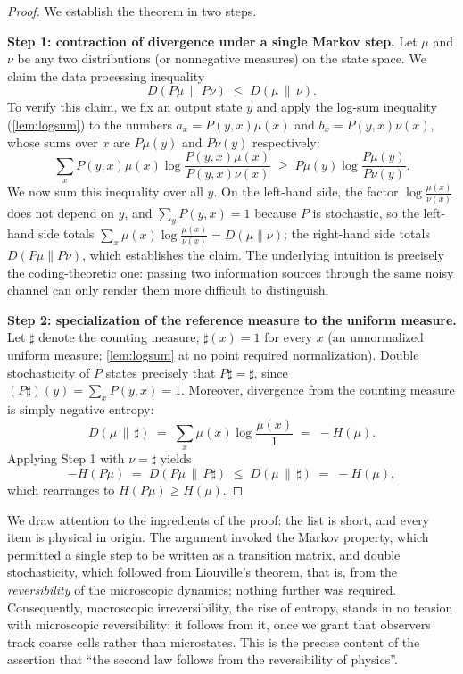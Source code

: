 \documentclass[11pt]{article}
\begin{document}
\begin{proof}
We establish the theorem in two steps.

\textbf{Step 1: contraction of divergence under a single Markov step.} Let $\mu$ and $\nu$ be any two distributions (or nonnegative measures) on the state space. We claim the data processing inequality
\[
D(P\mu \,\|\, P\nu) \;\le\; D(\mu \,\|\, \nu).
\]
To verify this claim, we fix an output state $y$ and apply the log-sum inequality (\cref{lem:logsum}) to the numbers $a_x = P(y,x)\mu(x)$ and $b_x = P(y,x)\nu(x)$, whose sums over $x$ are $P\mu(y)$ and $P\nu(y)$ respectively:
\[
\sum_x P(y,x)\mu(x) \log \frac{P(y,x)\mu(x)}{P(y,x)\nu(x)} \;\ge\; P\mu(y) \log \frac{P\mu(y)}{P\nu(y)}.
\]
We now sum this inequality over all $y$. On the left-hand side, the factor $\log\frac{\mu(x)}{\nu(x)}$ does not depend on $y$, and $\sum_y P(y,x) = 1$ because $P$ is stochastic, so the left-hand side totals $\sum_x \mu(x)\log\frac{\mu(x)}{\nu(x)} = D(\mu\|\nu)$; the right-hand side totals $D(P\mu \| P\nu)$, which establishes the claim. The underlying intuition is precisely the coding-theoretic one: passing two information sources through the same noisy channel can only render them more difficult to distinguish.

\textbf{Step 2: specialization of the reference measure to the uniform measure.} Let $\sharp$ denote the counting measure, $\sharp(x) = 1$ for every $x$ (an unnormalized uniform measure; \cref{lem:logsum} at no point required normalization). Double stochasticity of $P$ states precisely that $P\sharp = \sharp$, since $(P\sharp)(y) = \sum_x P(y,x) = 1$. Moreover, divergence from the counting measure is simply negative entropy:
\[
D(\mu \,\|\, \sharp) \;=\; \sum_x \mu(x) \log \frac{\mu(x)}{1} \;=\; -H(\mu).
\]
Applying Step 1 with $\nu = \sharp$ yields
\[
-H(P\mu) \;=\; D(P\mu \,\|\, P \sharp) \;\le\; D(\mu \,\|\, \sharp) \;=\; -H(\mu),
\]
which rearranges to $H(P\mu) \ge H(\mu)$.
\end{proof}

We draw attention to the ingredients of the proof: the list is short, and every item is physical in origin. The argument invoked the Markov property, which permitted a single step to be written as a transition matrix, and double stochasticity, which followed from Liouville's theorem, that is, from the \emph{reversibility} of the microscopic dynamics; nothing further was required. Consequently, macroscopic irreversibility, the rise of entropy, stands in no tension with microscopic reversibility; it follows from it, once we grant that observers track coarse cells rather than microstates. This is the precise content of the assertion that ``the second law follows from the reversibility of physics''.
\end{document}
